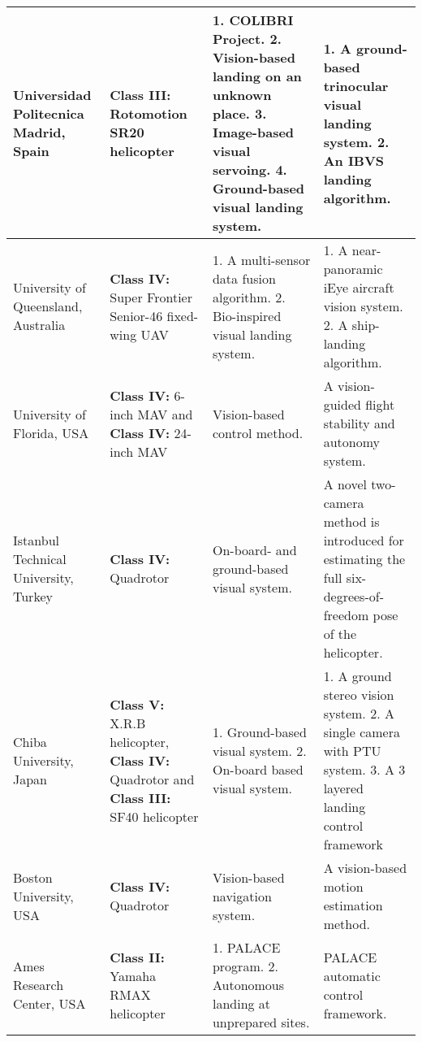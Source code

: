 \begin{landscape}
\begin{longtable}{m{5cm}m{5cm}m{5cm}m{5cm}}
		\hline
		\centering Universidad Politecnica Madrid, Spain \cite{Garcia-Pardo2002}\cite{Martinez2010}\cite{Martinez2009a} & \centering \textbf{Class III:} Rotomotion SR20 helicopter & 1. COLIBRI Project. 2. Vision-based landing on an unknown place. 3. Image-based visual servoing. 4. Ground-based visual landing system. & 1. A ground-based trinocular visual landing system. 2. An IBVS landing algorithm.\\
		\hline
		\centering  University of Queensland, Australia \cite{Thurrowgood2014}\cite{Yang2011} & \centering \textbf{Class IV:} Super Frontier Senior-46 fixed-wing UAV & 1. A multi-sensor data fusion algorithm. 2. Bio-inspired visual landing system. & 1. A near-panoramic iEye aircraft vision system. 2. A ship-landing algorithm.\\
		\hline
		\centering  University of Florida, USA \cite{Ettinger2002} & \centering \textbf{Class IV:} 6-inch MAV and \textbf{Class IV:} 24-inch MAV & Vision-based control method. & A vision-guided flight stability and autonomy system.\\
		\hline
		\centering  Istanbul Technical University, Turkey \cite{Altug2005} & \centering \textbf{Class IV:} Quadrotor & On-board- and ground-based visual system. & A novel two-camera method is introduced for estimating the full six-degrees-of-freedom pose of the helicopter. \\
		\hline
		\centering  Chiba University, Japan \cite{PEBRIANTI2010}\cite{Yu2010}\cite{Wang2006}& \centering \textbf{Class V:} X.R.B helicopter, \textbf{Class IV:} Quadrotor and \textbf{Class III:} SF40 helicopter & 1. Ground-based visual system. 2. On-board based visual system. & 1. A ground stereo vision system. 2. A single camera with PTU system. 3. A 3 layered landing control framework \\
		\hline
		\centering Boston University, USA \cite{Bosse1998} & \centering \textbf{Class IV:} Quadrotor & Vision-based navigation system. & A vision-based motion estimation method. \\
		\hline
		\centering Ames Research Center, USA \cite{Hubbard2006} & \centering \textbf{Class II:} Yamaha RMAX helicopter & 1. PALACE program. 2. Autonomous landing at unprepared sites. & PALACE automatic control framework. \\
		
		\hline
		
	\end{longtable}
	
	\normalsize
	\renewcommand{\thefootnote}{\arabic{footnote}}
	\renewcommand{\arraystretch}{1.0}
\end{landscape}